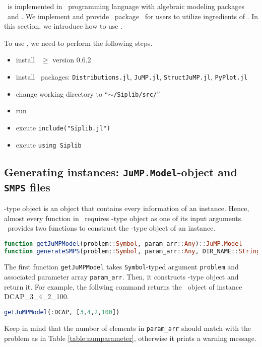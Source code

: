 \siplibtwo\ is implemented in \julia\ programming language with algebraic modeling packages \jump\ and \structjump. We implement and provide \julia\ package \siplibjl\ for users to utilize ingredients of \siplibtwo. In this section, we introduce how to use \siplibjl.

To use \siplibjl, we need to perform the following steps.
\begin{itemize}
	\item install \julia\ $\ge$ version 0.6.2
	\item install \julia\ packages: \texttt{Distributions.jl}, \texttt{JuMP.jl}, \texttt{StructJuMP.jl}, \texttt{PyPlot.jl}
	\item change working directory to ``\texttt{$\sim$/Siplib/src/}''
	\item run \julia\
	\item excute \texttt{include("Siplib.jl")}
	\item excute \texttt{using Siplib}
\end{itemize}

\subsection{Generating instances: \texttt{JuMP.Model}-object and \texttt{SMPS} files}
\jumpmodel-type object is an object that contains every information of an instance. Hence, almost every function in \siplibjl\ requires \jumpmodel-type object as one of its input arguments. \siplibjl\ provides two functions to construct the \jumpmodel-type object of an instance.
\begin{lstlisting}[frame=single,language=julia]
function getJuMPModel(problem::Symbol, param_arr::Any)::JuMP.Model
function generateSMPS(problem::Symbol, param_arr::Any, DIR_NAME::String="$(dirname(@__FILE__))/../instance")::JuMP.Model
\end{lstlisting}

The first function \texttt{getJuMPModel} takes \texttt{Symbol}-typed argument \texttt{problem} and associated parameter array \texttt{param\_arr}. Then, it constructs \jumpmodel-type object and return it. For example, the follwing command returns the \jumpmodel\ object of instance DCAP\_3\_4\_2\_100.
\begin{lstlisting}[frame=single,language=julia]
getJuMPModel(:DCAP, [3,4,2,100])
\end{lstlisting}
Keep in mind that the number of elements in \texttt{param\_arr} should match with the problem as in Table \ref{table:numparameter}, otherwise it prints a warning message.

